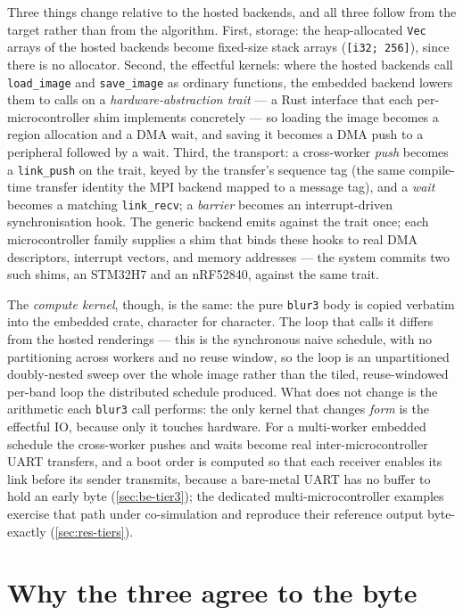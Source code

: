 Three things change relative to the hosted backends, and all three follow from the
target rather than from the algorithm. First, storage: the heap-allocated
\texttt{Vec} arrays of the hosted backends become fixed-size stack arrays
(\texttt{[i32; 256]}), since there is no allocator. Second, the effectful kernels:
where the hosted backends call \texttt{load\_image} and \texttt{save\_image} as
ordinary functions, the embedded backend lowers them to calls on a
\emph{hardware-abstraction trait} --- a Rust interface that each per-microcontroller
shim implements concretely --- so loading the image becomes a region allocation and a
DMA wait, and saving it becomes a DMA push to a peripheral followed by a wait. Third,
the transport: a cross-worker \emph{push} becomes a \texttt{link\_push} on the trait,
keyed by the transfer's sequence tag (the same compile-time transfer identity the MPI
backend mapped to a message tag), and a \emph{wait} becomes a matching
\texttt{link\_recv}; a \emph{barrier} becomes an interrupt-driven synchronisation
hook. The generic backend emits against the trait once; each microcontroller family
supplies a shim that binds these hooks to real DMA descriptors, interrupt vectors,
and memory addresses --- the system commits two such shims, an STM32H7 and an
nRF52840, against the same trait.

The \emph{compute kernel}, though, is the same: the pure \texttt{blur3} body is
copied verbatim into the embedded crate, character for character. The loop that
calls it differs from the hosted renderings --- this is the synchronous naive
schedule, with no partitioning across workers and no reuse window, so the loop is an
unpartitioned doubly-nested sweep over the whole image rather than the tiled,
reuse-windowed per-band loop the distributed schedule produced. What does not change
is the arithmetic each \texttt{blur3} call performs: the only kernel that changes
\emph{form} is the effectful IO, because only it touches hardware. For a multi-worker embedded
schedule the cross-worker pushes and waits become real inter-microcontroller UART
transfers, and a boot order is computed so that each receiver enables its link
before its sender transmits, because a bare-metal UART has no buffer to hold an
early byte (\cref{sec:be-tier3}); the dedicated multi-microcontroller examples
exercise that path under co-simulation and reproduce their reference output
byte-exactly (\cref{sec:res-tiers}).

\section{Why the three agree to the byte}\label{sec:wt-byteident}

